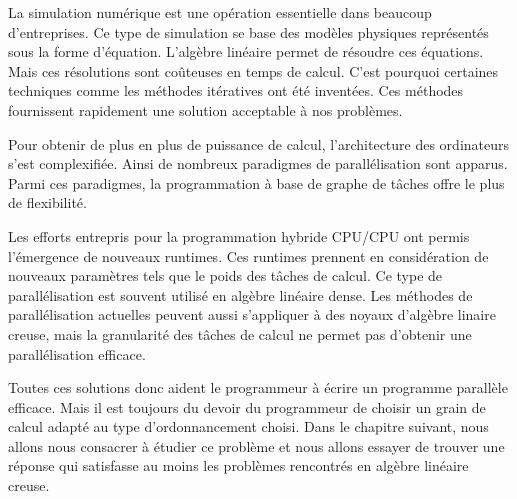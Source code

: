 La simulation numérique est une opération essentielle dans beaucoup d'entreprises.
%
Ce type de simulation se base des modèles physiques représentés sous la forme d'équation.
%
L'algèbre linéaire permet de résoudre ces équations.
%
Mais ces résolutions sont coûteuses en temps de calcul.
%
C'est pourquoi certaines techniques comme les méthodes itératives ont été inventées.
%
Ces méthodes fournissent rapidement une solution acceptable à nos problèmes.

Pour obtenir de plus en plus de puissance de calcul, l'architecture des ordinateurs s'est complexifiée.
%
Ainsi de nombreux paradigmes de parallélisation sont apparus.
%
Parmi ces paradigmes, la programmation à base de graphe de tâches offre le plus de flexibilité.

Les efforts entrepris pour la programmation hybride CPU/CPU ont permis l'émergence de nouveaux runtimes.
%
Ces runtimes prennent en considération de nouveaux paramètres tels que le poids des tâches de calcul.
%
Ce type de parallélisation est souvent utilisé en algèbre linéaire dense.
%
Les méthodes de parallélisation actuelles peuvent aussi s'appliquer à des noyaux d'algèbre linaire creuse, mais la granularité des tâches de calcul ne permet pas d'obtenir une parallélisation efficace.


Toutes ces solutions donc aident le programmeur à écrire un programme parallèle efficace.
%
Mais il est toujours du devoir du programmeur de choisir un grain de calcul adapté au type d'ordonnancement choisi.
%
Dans le chapitre suivant, nous allons nous consacrer à étudier ce problème et nous allons essayer de trouver une réponse qui satisfasse au moins les problèmes rencontrés en algèbre linéaire creuse.

